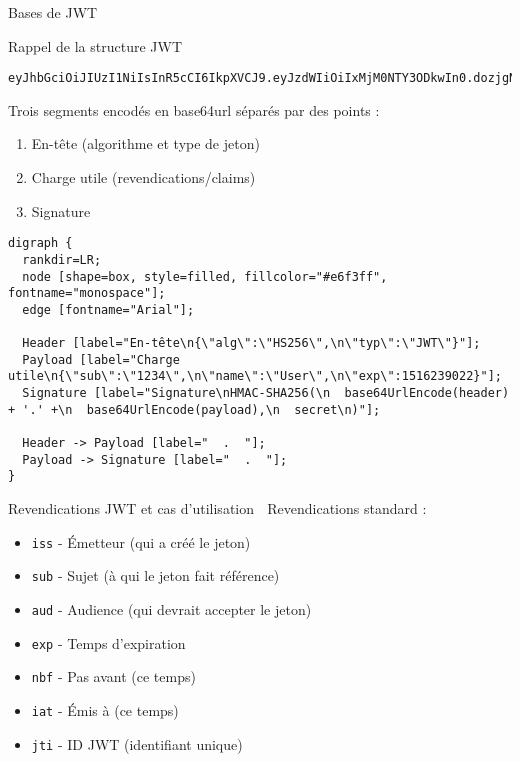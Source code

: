 \documentclass[presentation,aspectratio=169]{beamer}
\begin{document}
\begin{frame}[label={sec:orgf0db282},fragile]{Bases de JWT}
 \begin{block}{Rappel de la structure JWT 🔰}
\begin{verbatim}
eyJhbGciOiJIUzI1NiIsInR5cCI6IkpXVCJ9.eyJzdWIiOiIxMjM0NTY3ODkwIn0.dozjgNryP4J3jVmNHl0w5N_XgL0n3I9PlFUP0THsR8U
\end{verbatim}

Trois segments encodés en base64url séparés par des points :
\begin{enumerate}
\item \alert{En-tête} (algorithme et type de jeton)
\item \alert{Charge utile} (revendications/claims)
\item \alert{Signature}
\end{enumerate}

\begin{verbatim}
digraph {
  rankdir=LR;
  node [shape=box, style=filled, fillcolor="#e6f3ff", fontname="monospace"];
  edge [fontname="Arial"];

  Header [label="En-tête\n{\"alg\":\"HS256\",\n\"typ\":\"JWT\"}"];
  Payload [label="Charge utile\n{\"sub\":\"1234\",\n\"name\":\"User\",\n\"exp\":1516239022}"];
  Signature [label="Signature\nHMAC-SHA256(\n  base64UrlEncode(header) + '.' +\n  base64UrlEncode(payload),\n  secret\n)"];

  Header -> Payload [label="  .  "];
  Payload -> Signature [label="  .  "];
}
\end{verbatim}
\end{block}
\begin{block}{Revendications JWT et cas d'utilisation 🔰}
\alert{Revendications standard :}
\begin{itemize}
\item \texttt{iss} - Émetteur (qui a créé le jeton)
\item \texttt{sub} - Sujet (à qui le jeton fait référence)
\item \texttt{aud} - Audience (qui devrait accepter le jeton)
\item \texttt{exp} - Temps d'expiration
\item \texttt{nbf} - Pas avant (ce temps)
\item \texttt{iat} - Émis à (ce temps)
\item \texttt{jti} - ID JWT (identifiant unique)
\end{itemize}


\end{block}
\end{frame}
\end{document}
